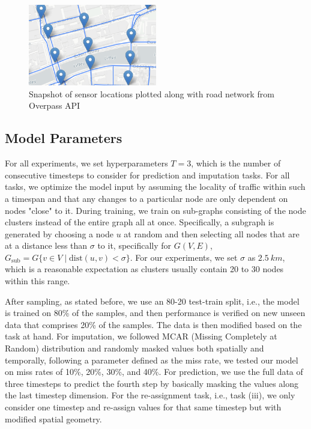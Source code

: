 \begin{figure}[htbp]
  \centering
  \includegraphics[width=0.5\textwidth]{dataset.png}
  \caption{Snapshot of sensor locations plotted along with road network from Overpass API}
  \label{fig:dataset}
\end{figure}


\subsection{Model Parameters}

For all experiments, we set hyperparameters $T = 3$, which is the number of consecutive timesteps to consider for prediction and imputation tasks. For all tasks, we optimize the model input by assuming the locality of traffic within such a timespan and that any changes to a particular node are only dependent on nodes "close" to it. During training, we train on sub-graphs consisting of the node clusters instead of the entire graph all at once. Specifically, a subgraph is generated by choosing a node $u$ at random and then selecting all nodes that are at a distance less than $\sigma$ to it, specifically for $G(V, E)$, $G_{\text{sub}} = G\{v \in V \; | \; \text{dist}(u, v) < \sigma\}$. For our experiments, we set $\sigma$ as $2.5\ km$, which is a reasonable expectation as clusters usually contain 20 to 30 nodes within this range.

After sampling, as stated before, we use an 80-20 test-train split, i.e., the model is trained on 80\% of the samples, and then performance is verified on new unseen data that comprises 20\% of the samples. The data is then modified based on the task at hand. For imputation, we followed MCAR (Missing Completely at Random) distribution and randomly masked values both spatially and temporally, following a parameter defined as the miss rate, we tested our model on miss rates of 10\%, 20\%, 30\%, and 40\%. For prediction, we use the full data of three timesteps to predict the fourth step by basically masking the values along the last timestep dimension. For the re-assignment task, i.e., task (iii), we only consider one timestep and re-assign values for that same timestep but with modified spatial geometry.

